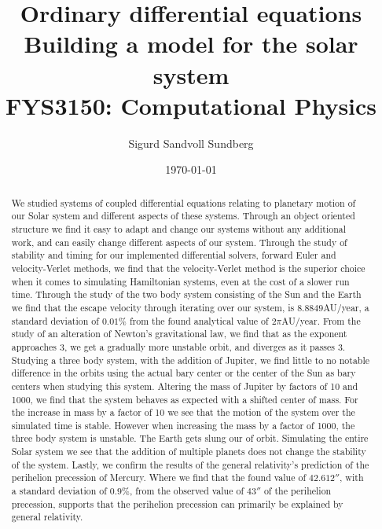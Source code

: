 \documentclass[%
reprint,
nofootinbib,
amsmath,amssymb,
aps,
]{revtex4-1}
\begin{document}
	
\title{Ordinary differential equations\\
	\normalsize{Building a model for the solar system} \\
	\hrulefill\small{ FYS3150: Computational Physics }\hrulefill}

\author{Sigurd Sandvoll Sundberg}

%

\date{\today}

\begin{abstract}%
We studied systems of coupled differential equations relating to planetary motion of our Solar system and different aspects of these systems. Through an object oriented structure we find it easy to adapt and change our systems without any additional work, and can easily change different aspects of our system. Through the study of stability and timing for our implemented differential solvers, forward Euler and velocity-Verlet methods, we find that the velocity-Verlet method is the superior choice when it comes to simulating Hamiltonian systems, even at the cost of a slower run time. Through the study of the two body system consisting of the Sun and the Earth we find that the escape velocity through iterating over our system, is $8.8849$AU/year, a standard deviation of $0.01\%$ from the found analytical value of $2\pi$AU/year. From the study of an alteration of Newton's gravitational law, we find that as the exponent approaches $3$, we get a gradually more unstable orbit, and diverges as it passes 3. Studying a three body system, with the addition of Jupiter, we find little to no notable difference in the orbits using the actual bary center or the center of the Sun as bary centers when studying this system. Altering the mass of Jupiter by factors of 10 and 1000, we find that the system behaves as expected with a shifted center of mass. For the increase in mass by a factor of 10 we see that the motion of the system over the simulated time is stable. However when increasing the mass by a factor of 1000, the three body system is unstable. The Earth gets slung our of orbit. Simulating the entire Solar system we see that the addition of multiple planets does not change the stability of the system. Lastly, we confirm the results of the general relativity's prediction of the perihelion precession of Mercury. Where we find that the found value of $42.612''$, with a standard deviation of $0.9\%$, from the observed value of $43''$ of the perihelion precession, supports that the perihelion precession can primarily be explained by general relativity. 
\end{abstract}
\end{document}
